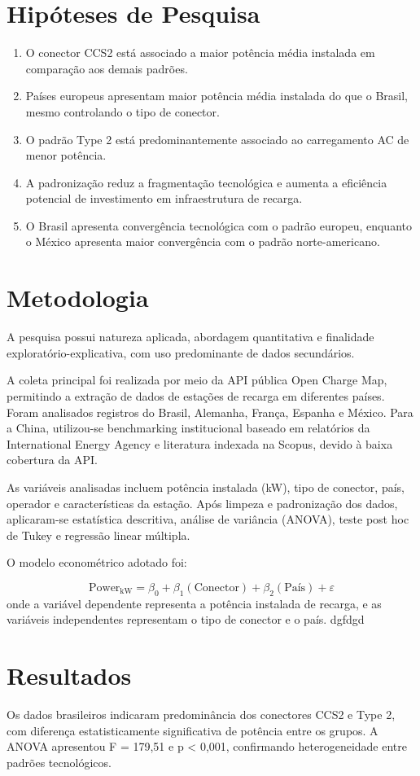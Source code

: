 \documentclass[12pt]{article}
\begin{document}
\section{Hipóteses de Pesquisa}
\begin{enumerate}[label=H\arabic*:]
\item O conector CCS2 está associado a maior potência média instalada em comparação aos demais padrões.
\item Países europeus apresentam maior potência média instalada do que o Brasil, mesmo controlando o tipo de conector.
\item O padrão Type 2 está predominantemente associado ao carregamento AC de menor potência.
\item A padronização reduz a fragmentação tecnológica e aumenta a eficiência potencial de investimento em infraestrutura de recarga.
\item O Brasil apresenta convergência tecnológica com o padrão europeu, enquanto o México apresenta maior convergência com o padrão norte-americano.
\end{enumerate}
\section{Metodologia}
A pesquisa possui natureza aplicada, abordagem quantitativa e finalidade exploratório-explicativa, com uso predominante de dados secundários. 

A coleta principal foi realizada por meio da API pública Open Charge Map, permitindo a extração de dados de estações de recarga em diferentes países. Foram analisados registros do Brasil, Alemanha, França, Espanha e México. Para a China, utilizou-se benchmarking institucional baseado em relatórios da International Energy Agency e literatura indexada na Scopus, devido à baixa cobertura da API. 

As variáveis analisadas incluem potência instalada (kW), tipo de conector, país, operador e características da estação. Após limpeza e padronização dos dados, aplicaram-se estatística descritiva, análise de variância (ANOVA), teste post hoc de Tukey e regressão linear múltipla. 

O modelo econométrico adotado foi: 

\[
\text{Power}_{\mathrm{kW}} = \beta_0 + \beta_1(\text{Conector}) + \beta_2(\text{País}) + \varepsilon
\]  onde a variável dependente representa a potência instalada de recarga, e as variáveis independentes representam o tipo de conector e o país. 
dgfdgd
\section{Resultados}
Os dados brasileiros indicaram predominância dos conectores CCS2 e Type 2, com diferença estatisticamente significativa de potência entre os grupos. A ANOVA apresentou F = 179,51 e p < 0,001, confirmando heterogeneidade entre padrões tecnológicos. 
\end{document}
